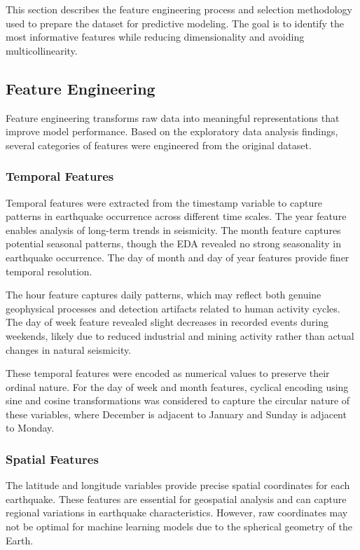 
This section describes the feature engineering process and selection methodology used to prepare the dataset for predictive modeling. The goal is to identify the most informative features while reducing dimensionality and avoiding multicollinearity.

\subsection{Feature Engineering}

Feature engineering transforms raw data into meaningful representations that improve model performance. Based on the exploratory data analysis findings, several categories of features were engineered from the original dataset.

\subsubsection{Temporal Features}

Temporal features were extracted from the timestamp variable to capture patterns in earthquake occurrence across different time scales. The year feature enables analysis of long-term trends in seismicity. The month feature captures potential seasonal patterns, though the EDA revealed no strong seasonality in earthquake occurrence. The day of month and day of year features provide finer temporal resolution.

The hour feature captures daily patterns, which may reflect both genuine geophysical processes and detection artifacts related to human activity cycles. The day of week feature revealed slight decreases in recorded events during weekends, likely due to reduced industrial and mining activity rather than actual changes in natural seismicity.

These temporal features were encoded as numerical values to preserve their ordinal nature. For the day of week and month features, cyclical encoding using sine and cosine transformations was considered to capture the circular nature of these variables, where December is adjacent to January and Sunday is adjacent to Monday.

\subsubsection{Spatial Features}

The latitude and longitude variables provide precise spatial coordinates for each earthquake. These features are essential for geospatial analysis and can capture regional variations in earthquake characteristics. However, raw coordinates may not be optimal for machine learning models due to the spherical geometry of the Earth.

